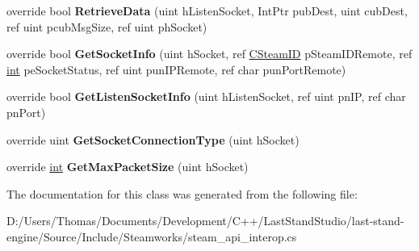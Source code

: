 \begin{DoxyCompactItemize}
\item 
\hypertarget{classValve_1_1Steamworks_1_1CSteamNetworking_a60f46b66b241df5a0b47353f07bf92d7}{}override bool {\bfseries Retrieve\+Data} (uint h\+Listen\+Socket, Int\+Ptr pub\+Dest, uint cub\+Dest, ref uint pcub\+Msg\+Size, ref uint ph\+Socket)\label{classValve_1_1Steamworks_1_1CSteamNetworking_a60f46b66b241df5a0b47353f07bf92d7}

\item 
\hypertarget{classValve_1_1Steamworks_1_1CSteamNetworking_a06851931faa457e131bb1aabab41a237}{}override bool {\bfseries Get\+Socket\+Info} (uint h\+Socket, ref \hyperlink{structValve_1_1Steamworks_1_1CSteamID}{C\+Steam\+I\+D} p\+Steam\+I\+D\+Remote, ref \hyperlink{SDL__thread_8h_a6a64f9be4433e4de6e2f2f548cf3c08e}{int} pe\+Socket\+Status, ref uint pun\+I\+P\+Remote, ref char pun\+Port\+Remote)\label{classValve_1_1Steamworks_1_1CSteamNetworking_a06851931faa457e131bb1aabab41a237}

\item 
\hypertarget{classValve_1_1Steamworks_1_1CSteamNetworking_abb6d09fde81d279e96bd4f5c66d0ad1d}{}override bool {\bfseries Get\+Listen\+Socket\+Info} (uint h\+Listen\+Socket, ref uint pn\+I\+P, ref char pn\+Port)\label{classValve_1_1Steamworks_1_1CSteamNetworking_abb6d09fde81d279e96bd4f5c66d0ad1d}

\item 
\hypertarget{classValve_1_1Steamworks_1_1CSteamNetworking_a2cf225518e4f277c9b55dccfb4395b49}{}override uint {\bfseries Get\+Socket\+Connection\+Type} (uint h\+Socket)\label{classValve_1_1Steamworks_1_1CSteamNetworking_a2cf225518e4f277c9b55dccfb4395b49}

\item 
\hypertarget{classValve_1_1Steamworks_1_1CSteamNetworking_a250b2b1a778fe8920b1155fd8282c604}{}override \hyperlink{SDL__thread_8h_a6a64f9be4433e4de6e2f2f548cf3c08e}{int} {\bfseries Get\+Max\+Packet\+Size} (uint h\+Socket)\label{classValve_1_1Steamworks_1_1CSteamNetworking_a250b2b1a778fe8920b1155fd8282c604}

\end{DoxyCompactItemize}


The documentation for this class was generated from the following file\+:\begin{DoxyCompactItemize}
\item 
D\+:/\+Users/\+Thomas/\+Documents/\+Development/\+C++/\+Last\+Stand\+Studio/last-\/stand-\/engine/\+Source/\+Include/\+Steamworks/steam\+\_\+api\+\_\+interop.\+cs\end{DoxyCompactItemize}
